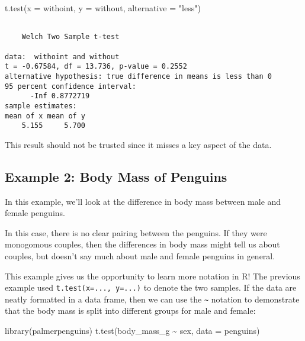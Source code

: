\documentclass[
  letterpaper,
  DIV=11,
  numbers=noendperiod]{scrreprt}
\newenvironment{Shaded}{\begin{snugshade}}{\end{snugshade}}
\newcommand{\AttributeTok}[1]{\textcolor[rgb]{0.40,0.45,0.13}{#1}}
\newcommand{\FunctionTok}[1]{\textcolor[rgb]{0.28,0.35,0.67}{#1}}
\newcommand{\NormalTok}[1]{\textcolor[rgb]{0.00,0.23,0.31}{#1}}
\newcommand{\SpecialCharTok}[1]{\textcolor[rgb]{0.37,0.37,0.37}{#1}}
\newcommand{\StringTok}[1]{\textcolor[rgb]{0.13,0.47,0.30}{#1}}
\begin{document}
\begin{Shaded}
\begin{Highlighting}[]
\FunctionTok{t.test}\NormalTok{(}\AttributeTok{x =}\NormalTok{ withoint, }\AttributeTok{y =}\NormalTok{ without, }\AttributeTok{alternative =} \StringTok{"less"}\NormalTok{)}
\end{Highlighting}
\end{Shaded}

\begin{verbatim}

    Welch Two Sample t-test

data:  withoint and without
t = -0.67584, df = 13.736, p-value = 0.2552
alternative hypothesis: true difference in means is less than 0
95 percent confidence interval:
      -Inf 0.8772719
sample estimates:
mean of x mean of y 
    5.155     5.700 
\end{verbatim}

This result should not be trusted since it misses a key aspect of the
data.

\hypertarget{example-2-body-mass-of-penguins}{%
\subsection{Example 2: Body Mass of
Penguins}\label{example-2-body-mass-of-penguins}}

In this example, we'll look at the difference in body mass between male
and female penguins.

In this case, there is no clear pairing between the penguins. If they
were monogomous couples, then the differences in body mass might tell us
about couples, but doesn't say much about male and female penguins in
general.

This example gives us the opportunity to learn more notation in R! The
previous example used \texttt{t.test(x=...,\ y=...)} to denote the two
samples. If the data are neatly formatted in a data frame, then we can
use the \texttt{\textasciitilde{}} notation to demonstrate that the body
mass is split into different groups for male and female:

\begin{Shaded}
\begin{Highlighting}[]
\FunctionTok{library}\NormalTok{(palmerpenguins)}
\FunctionTok{t.test}\NormalTok{(body\_mass\_g }\SpecialCharTok{\textasciitilde{}}\NormalTok{ sex, }\AttributeTok{data =}\NormalTok{ penguins)}
\end{Highlighting}
\end{Shaded}
\end{document}
